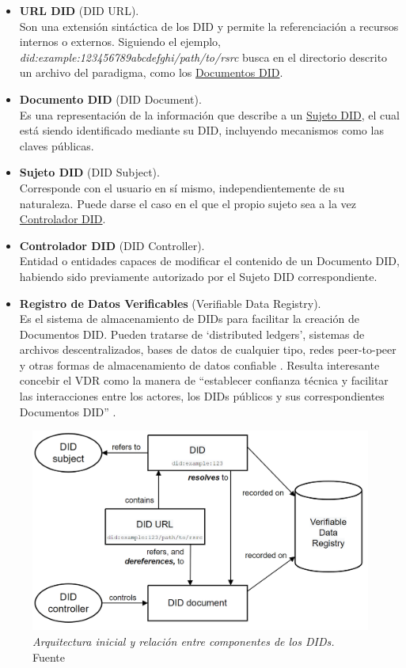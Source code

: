 \documentclass[../main.tex]{subfiles}
\begin{document}
\begin{itemize}
    \item \textbf{URL DID} (DID URL). \\
    Son una extensión sintáctica de los \acrshort{DID} y permite la referenciación a recursos internos o externos. Siguiendo el ejemplo, \textit{did:example:123456789abcdefghi/path/to/rsrc} busca en el directorio descrito un archivo del paradigma, como los \underline{Documentos DID}. 
    
    \item \textbf{Documento DID} (DID Document). \\
    Es una representación de la información que describe a un \underline{Sujeto DID}, el cual está siendo identificado mediante su \acrshort{DID}, incluyendo mecanismos como las claves públicas.
    
    \item \textbf{Sujeto DID} (DID Subject). \\
    Corresponde con el usuario en sí mismo, independientemente de su naturaleza. Puede darse el caso en el que el propio sujeto sea a la vez \underline{Controlador DID}.
    
    \item \textbf{Controlador DID} (DID Controller). \\
    Entidad o entidades capaces de modificar el contenido de un Documento DID, habiendo sido previamente autorizado por el Sujeto DID correspondiente.
    
    \item \textbf{Registro de Datos Verificables} (Verifiable Data Registry). \\
    Es el sistema de almacenamiento de \acrshort{DID}s para facilitar la creación de Documentos DID. Pueden tratarse de `distributed ledgers', sistemas de archivos descentralizados, bases de datos de cualquier tipo, redes peer-to-peer y otras formas de almacenamiento de datos confiable \cite{DID-core}. Resulta interesante concebir el \acrfull{VDR} como la manera de ``establecer confianza técnica y facilitar las interacciones entre los actores, los \acrshort{DID}s públicos y sus correspondientes Documentos DID'' \cite{ChallengesSSI}.
    \\
\end{itemize}

\begin{figure}[htbp]
    \centering
    \includegraphics[width=0.75\linewidth]{images/DID_Arquitectura.png}
    \caption{\textit{Arquitectura inicial y relación entre componentes de los \acrshort{DID}s.} Fuente \cite{DID-core}}
    \label{fig:DID}
\end{figure}
\end{document}

